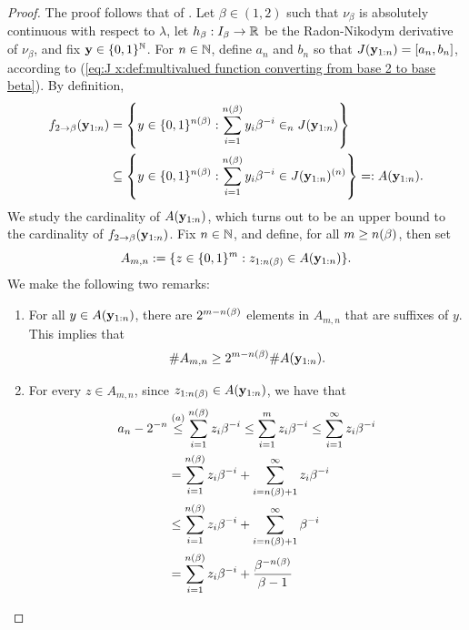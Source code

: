 \begin{proof}
    The proof follows that of \cite[Lemma 3.4]{kempton2013counting}. Let $\beta \in (1,2)$ such that $\nu_\beta$ is absolutely continuous with respect to $\lambda$, let $h_\beta : I_\beta \to \mathbb{R}$ be the Radon-Nikodym derivative of $\nu_\beta$, and fix ${\bf y} \in \{0,1\}^{\mathbb{N}}$. For $n \in \mathbb{N}$, define $a_n$ and $b_n$ so that $J({\bf y}_{1:n}) = [a_n,b_n]$, according to (\ref{eq:J x:def:multivalued function converting from base 2 to base beta}). By definition,
    \begin{align}
        f_{2 \to \beta}({\bf y}_{1:n}) &=  \left\{ y \in \{0,1\}^{n(\beta)} :  \sum_{i=1}^{n(\beta)} y_i \beta^{-i} \in_{n} J({\bf y}_{1:n})\right\}\\
        &\subseteq \left\{ y \in \{0,1\}^{n(\beta)} :  \sum_{i=1}^{n(\beta)} y_i \beta^{-i} \in J({\bf y}_{1:n})^{(n)}\right\} =: A({\bf y}_{1:n}).
    \end{align}
    We study the cardinality of $A({\bf y}_{1:n})$, which turns out to be an upper bound to the cardinality of $f_{2 \to \beta}({\bf y}_{1:n})$. Fix $n \in \mathbb{N}$, and define, for all $m \geq n(\beta)$, then set 
    \begin{equation}
        A_{m,n} := \{ z \in \{0,1\}^{m} : z_{1:n(\beta)} \in A({\bf y}_{1:n}) \}.
    \end{equation}
    We make the following two remarks:
    \begin{enumerate}[label=(\alph*)]
        \item For all $y \in A({\bf y}_{1:n})$, there are $2^{m-n(\beta)}$ elements in $A_{m,n}$ that are suffixes of $y$. This implies that
        \begin{equation}
            \# A_{m,n} \geq 2^{m - n(\beta)} \# A({\bf y}_{1:n}).
        \end{equation}
        \item For every $z \in A_{m,n}$, since $z_{1:n(\beta)} \in A({\bf y}_{1:n})$, we have that
        \begin{align}
            a_n - 2^{-n} &\overset{(a)}{\leq} \sum_{i=1}^{\nlogbeta} z_i \beta^{-i} \leq \sum_{i=1}^{m} z_i \beta^{-i} \leq \sum_{i=1}^{\infty} z_i \beta^{-i}\\
            & = \sum_{i=1}^{\nlogbeta} z_i \beta^{-i} + \sum_{i=\nlogbeta+1}^{\infty} z_i \beta^{-i}\\
            & \leq \sum_{i=1}^{\nlogbeta} z_i \beta^{-i} + \sum_{i=\nlogbeta+1}^{\infty} \beta^{-i}\\
            & = \sum_{i=1}^{\nlogbeta} z_i \beta^{-i} + \frac{\beta^{-\nlogbeta}}{\beta-1}\\

\end{align}
\end{enumerate}
\end{proof}
